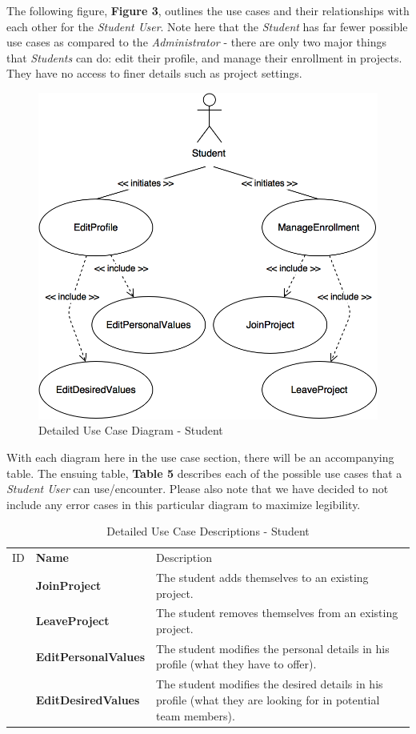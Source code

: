 \documentclass[12pt,letterpaper]{article}
\begin{document}
The following figure, {\bf Figure 3}, outlines the use cases and their relationships with each other for the {\it Student User}. Note here that the {\it Student} has far fewer possible use cases
as compared to the {\it Administrator} - there are only two major things that {\it Students} can do: edit their profile, and manage their enrollment in projects. They have no 
access to finer details such as project settings. 

\begin{figure}[H]
	\centering{}
	\includegraphics[scale=0.25]{imgs/detailed-student-use-case-diagram.png}
	\caption{Detailed Use Case Diagram - Student}
\end{figure}

With each diagram here in the use case section, there will be an accompanying table. The ensuing table, {\bf Table 5} describes each of the possible use cases that a {\it Student User} can use/encounter.
Please also note that we have decided to not include any error cases in this particular diagram to maximize legibility.

\begin{table}[H]
	\caption{Detailed Use Case Descriptions - Student}
	\begin{tabu} to 
	    \tableheader{}ID & Name & Description\\
		\joinproject{} & JoinProject & The student adds themselves to an existing project.\\
		\leaveproject{} & LeaveProject & The student removes themselves from an existing project.\\
		\editpersonalvalues{} & EditPersonalValues & The student modifies the personal details in his profile (what they have to offer).\\
		\editdesiredvalues{} & EditDesiredValues & The student modifies the desired details in his profile (what they are looking for in potential team members).\\
	\end{tabu}
\end{table}
\end{document}
